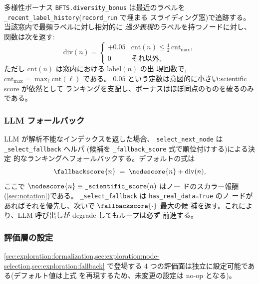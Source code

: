 多様性ボーナス \texttt{BFTS.diversity\_bonus} は最近のラベルを
\texttt{\_recent\_label\_history}(\texttt{record\_run} で埋まる
スライディング窓)で追跡する。当該窓内で最頻ラベルに対し相対的に
\emph{過少表現}のラベルを持つノードに対し、関数は次を返す:
\begin{equation}\label{eq:diversity}
  \mathrm{div}(n) =
    \begin{cases}
      +0.05 & \mathrm{cnt}(n) \le \tfrac{1}{2}\,\mathrm{cnt}_{\max},\\
      0     & \text{それ以外,}
    \end{cases}
\end{equation}
ただし $\mathrm{cnt}(n)$ は窓内における $\mathrm{label}(n)$ の出
現回数で,$\mathrm{cnt}_{\max}=\max_\ell\mathrm{cnt}(\ell)$ である。
$0.05$ という定数は意図的に小さい:scientific score が依然として
ランキングを支配し、ボーナスはほぼ同点のものを破るのみである。

\subsubsection*{LLM フォールバック}\label{sec:exploration:fallback}

LLM が解析不能なインデックスを返した場合、
\texttt{select\_next\_node} は \texttt{\_select\_fallback} ヘルパ
(候補を \texttt{\_fallback\_score} 式で順位付けする)による決定
的なランキングへフォールバックする。デフォルトの式は
\begin{equation}\label{eq:fallback}
  \fallbackscore{n} \;=\; \nodescore{n} + \mathrm{div}(n),
\end{equation}
ここで $\nodescore{n}\equiv\texttt{\_scientific\_score}(n)$ はノー
ドのスカラー報酬(\cref{sec:notation})である。
\texttt{\_select\_fallback} は \texttt{has\_real\_data=True} のノ
ードがあればそれを優先し、次いで $\fallbackscore{\cdot}$ 最大の候
補を返す。これにより、LLM 呼び出しが degrade してもループは必ず
前進する。

\subsubsection*{評価層の設定}\label{sec:exploration:config-layers}

\cref{sec:exploration:formalization,sec:exploration:node-selection,sec:exploration:fallback}
で登場する 4 つの評価面は独立に設定可能である(デフォルト値は上式
を再現するため、未変更の設定は no-op となる)。

